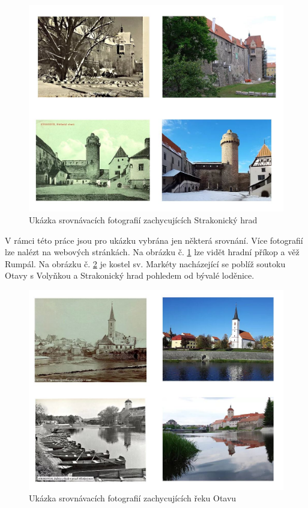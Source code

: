 \documentclass[thesis=M,czech]{FITthesis}[2012/06/26]
\begin{document}
\begin{figure}[h!]
	\centering
	\includegraphics[width=16cm]{pics/srovnani.jpg}
	\caption{Ukázka srovnávacích fotografií zachycujících Strakonický hrad}
	\label{obrazek:srov}
\end{figure}

V rámci této práce jsou pro ukázku vybrána jen některá srovnání. Více fotografií lze nalézt na webových stránkách. Na obrázku č. \ref{obrazek:srov} lze vidět hradní příkop a věž Rumpál. Na obrázku č. \ref{obrazek:fotodok} je kostel sv. Markéty nacházející se poblíž soutoku Otavy s Volyňkou a Strakonický hrad pohledem od bývalé loděnice.

\clearpage

\begin{figure}[t!]
	\centering
	\includegraphics[width=16cm]{pics/fotodok1.jpg}
	\caption{Ukázka srovnávacích fotografií zachycujících řeku Otavu}
	\label{obrazek:fotodok}
\end{figure}
\end{document}
